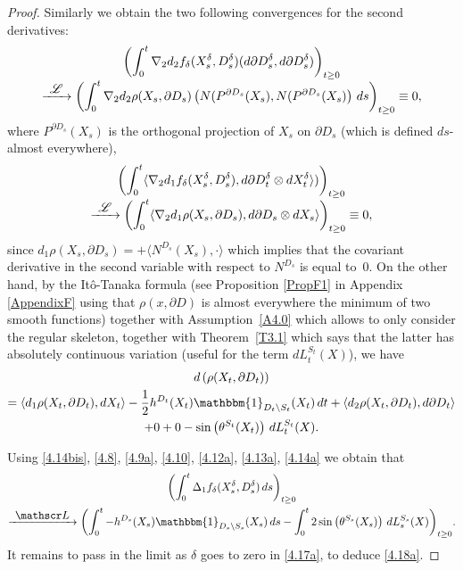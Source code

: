 \documentclass[10pt]{amsart}
\let\backslash\setminus
\newcommand\To[1]{\mathchoice{\xrightarrow{\textstyle\kern4pt#1\kern3pt}}{\stackrel{#1}{\longrightarrow}}{}{}}
\theoremstyle{plain}
\theoremstyle{definition}
\newcommand{\SL}{{\mathscr L}}
\newcommand{\un}{\mathbbm{1}}
\let\f\frac
\let\D\Delta
\let\d\delta
\let\n\nabla
\begin{document}
\begin{proof}
Similarly we obtain the two following convergences for the second derivatives:\vspace*{-5pt}
\begin{multline}
\label{4.12a}
\biggl(\int_0^t \n_2d_2f_\d(X_s^\d, D_s^\d)(d\partial D_s^\d,d\partial D_s^\d)\biggr)_{t\ge 0}\\[-3pt]
\To{\SL}\biggl(\int_0^t \n_2d_2\rho(X_s, \partial D_s)\left(N(P^{\partial D_s}(X_s),N(P^{\partial D_s}(X_s)\right)\,ds\biggr)_{t\ge 0}\equiv 0,
\end{multline}
where $P^{\partial D_s}(X_s)$ is the orthogonal projection of $X_s$ on $\partial D_s$ (which is defined $ds$-almost everywhere),\vspace*{-5pt}
\begin{multline}
\label{4.13a}
\biggl(\int_0^t \langle \n_{2}d_1f_\d(X_s^\d, D_s^\d), d\partial D_t^\d \otimes dX_t^\d\rangle )\biggr)_{t\ge 0}\\[-3pt]
\To{\SL}\biggl(\int_0^t \langle \n_{2}d_1\rho (X_s,\partial D_s), d\partial D_s\otimes dX_s\rangle\biggr)_{t\ge 0}\equiv 0,
\end{multline}
since $d_1\rho(X_s, \partial D_s)= +\langle N^{D_s}(X_s),\cdot \rangle$ which implies that the covariant derivative in the second variable with respect to $N^{D_s}$ is equal to~$0$.
On the other hand, by the Itô-Tanaka formula
(see Proposition \ref{PropF1} in Appendix \ref{AppendixF}
using that $\rho(x,\partial D)$ is almost everywhere the minimum of two smooth functions) together with Assumption~\ref{A4.0} which allows to only consider the regular skeleton, together with Theorem~\ref{T3.1} which says that the latter has absolutely continuous variation (useful for the term $dL_t^{S_t}(X)$),
we have
\begin{multline}
\label{4.14a}
d\left(\rho(X_t,\partial D_t)\right)\\
=
\langle d_1\rho (X_t,\partial D_t), dX_t\rangle -\f12h^{D_t}(X_t)\un_{D_t \backslash S_t}(X_t) \,dt+\langle d_2\rho (X_t,\partial D_t), d\partial D_t\rangle\\
+0+0-\sin\left(\theta^{S_t}(X_t)\right)\,dL_t^{S_t}(X).
\end{multline}

Using \eqref{4.14bis}, \eqref{4.8}, \eqref{4.9a}, \eqref{4.10}, \eqref{4.12a}, \eqref{4.13a}, \eqref{4.14a} we obtain that
\begin{multline}
\label{4.16a}
\biggl(\int_0^t \D_1f_\d(X_s^\d, D_s^\d)\, ds\biggr)_{t\ge 0}\\
\To{\SL}\biggl(\int_0^t -h^{D_s} (X_s) \un_{D_s \backslash S_s}(X_s) \, ds-\int_0^t2\sin\left(\theta^{S_s}(X_s)\right)\,dL_s^{S_s}(X) \biggr)_{t\ge 0}.
\end{multline}
It remains to pass in the limit as $\d$ goes to zero in \eqref{4.17a}, to deduce \eqref{4.18a}.
\end{proof}
\end{document}
